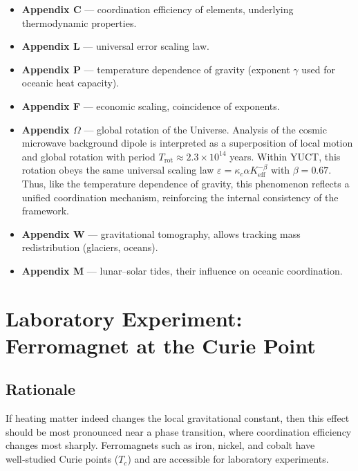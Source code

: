 \documentclass[12pt]{article}
\theoremstyle{remark}
\begin{document}
	\begin{itemize}
		\item \textbf{Appendix C} — coordination efficiency of elements, underlying thermodynamic properties.
		\item \textbf{Appendix L} — universal error scaling law.
		\item \textbf{Appendix P} — temperature dependence of gravity (exponent \(\gamma\) used for oceanic heat capacity).
		\item \textbf{Appendix F} — economic scaling, coincidence of exponents.
		\item \textbf{Appendix \(\Omega\)} — global rotation of the Universe. Analysis of the cosmic microwave background dipole is interpreted as a superposition of local motion and global rotation with period \(T_{\mathrm{rot}} \approx 2.3\times10^{14}\) years. Within YUCT, this rotation obeys the same universal scaling law \(\varepsilon = \kappa_c \alpha K_{\mathrm{eff}}^{-\beta}\) with \(\beta = 0.67\). Thus, like the temperature dependence of gravity, this phenomenon reflects a unified coordination mechanism, reinforcing the internal consistency of the framework.
		\item \textbf{Appendix W} — gravitational tomography, allows tracking mass redistribution (glaciers, oceans).
		\item \textbf{Appendix M} — lunar–solar tides, their influence on oceanic coordination.
	\end{itemize}
	
	\section{Laboratory Experiment: Ferromagnet at the Curie Point}
	\label{sec:lab}
	
	\subsection{Rationale}
	\label{subsec:lab-rationale}
	
	If heating matter indeed changes the local gravitational constant, then this effect
	should be most pronounced near a phase transition, where coordination efficiency changes
	most sharply. Ferromagnets such as iron, nickel, and cobalt have well‑studied Curie
	points ($T_c$) and are accessible for laboratory experiments.
	
\end{document}
